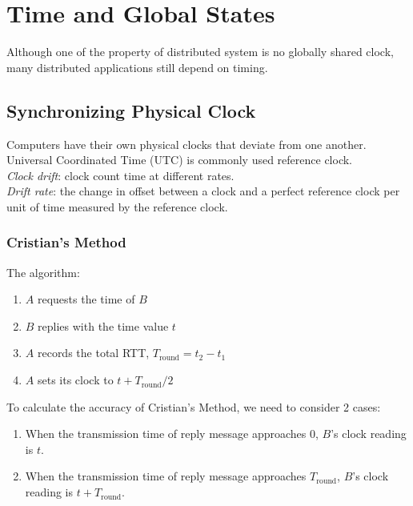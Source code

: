 \chapter{Time and Global States}
\begin{multicols*}{2}

\noindent Although one of the property of distributed system is no globally shared clock, many distributed applications still depend on timing.

\section{Synchronizing Physical Clock}

\noindent Computers have their own physical clocks that deviate from one another. Universal Coordinated Time (UTC) is commonly used reference clock.\\

\noindent \emph{Clock drift}: clock count time at different rates.\\

\noindent \emph{Drift rate}: the change in offset between a clock and a perfect reference clock per unit of time measured by the reference clock.

\subsection{Cristian's Method}

\noindent The algorithm:

\begin{enumerate}
  \item $A$ requests the time of $B$
  \item $B$ replies with the time value $t$
  \item $A$ records the total RTT, $T_{\text{round}}=t_2 - t_1$
  \item $A$ sets its clock to $t + T_{\text{round}} / 2$
\end{enumerate}

\noindent To calculate the accuracy of Cristian's Method, we need to consider 2 cases:
\begin{enumerate}
  \item When the transmission time of reply message approaches $0$, $B$'s clock reading is $t$.
  \item When the transmission time of reply message approaches $T_{\text{round}}$, $B$'s clock reading is $t+ T_{\text{round}}$.
\end{enumerate}


\end{multicols*}
